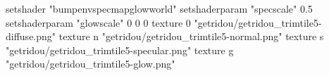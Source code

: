setshader "bumpenvspecmapglowworld"
setshaderparam "specscale" 0.5
setshaderparam "glowscale" 0 0 0
texture 0 "getridou/getridou_trimtile5-diffuse.png"
texture n "getridou/getridou_trimtile5-normal.png"
texture s "getridou/getridou_trimtile5-specular.png"
texture g "getridou/getridou_trimtile5-glow.png"